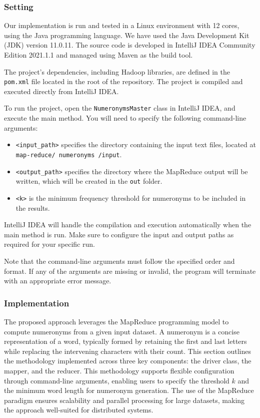 \documentclass[acmlarge]{acmart}
\begin{document}
\subsubsection{Setting}
Our implementation is run and tested in a Linux environment with 12 cores, using the Java programming language.
We have used the Java Development Kit (JDK) version 11.0.11.
The source code is developed in IntelliJ IDEA Community Edition 2021.1.1 and managed using Maven as the build tool.

The project’s dependencies, including Hadoop libraries, are defined in the \texttt{pom.xml} file located in the root of
the repository.
The project is compiled and executed directly from IntelliJ IDEA.

To run the project, open the \texttt{NumeronymsMaster} class in IntelliJ IDEA, and execute the main method.
You will need to specify the following command-line arguments:

\begin{itemize}
  \item \texttt{<input\_path>} specifies the directory containing the input text files, located at
        \texttt{map-reduce/ numeronyms /input}.
  \item \texttt{<output\_path>} specifies the directory where the MapReduce output will be written, which will be created in the \texttt{out} folder.
  \item \texttt{<k>} is the minimum frequency threshold for numeronyms to be included in the results.
\end{itemize}

IntelliJ IDEA will handle the compilation and execution automatically when the main method is run.
Make sure to configure the input and output paths as required for your specific run.

Note that the command-line arguments must follow the specified order and format.
If any of the arguments are missing or invalid, the program will terminate with an appropriate error message.

\subsubsection{Implementation}
The proposed approach leverages the MapReduce programming model to compute numeronyms from a given input dataset.
A numeronym is a concise representation of a word, typically formed by retaining the first and last letters while
replacing the intervening characters with their count.
This section outlines the methodology implemented across three key components: the driver class, the mapper, and the
reducer.
This methodology supports flexible configuration through command-line arguments, enabling users to specify the
threshold $k$ and the minimum word length for numeronym generation.
The use of the MapReduce paradigm ensures scalability and parallel processing for large datasets, making the approach
well-suited for distributed systems.
\end{document}
